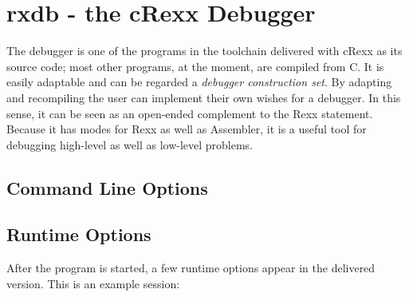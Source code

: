 \chapter{rxdb - the cRexx Debugger}\label{debugger}
The debugger is one of the programs in the toolchain delivered with cRexx
as its source code; most other programs, at the moment, are compiled
from C. It is easily adaptable and can be regarded a \emph{debugger
  construction set}. By adapting and recompiling the user can
implement their own wishes for a debugger. In this sense, it can be
seen as an open-ended complement to the Rexx 
statement. Because it has modes for Rexx as well as
 Assembler, it is a useful tool for debugging
high-level as well as low-level problems.
\section{Command Line Options}
\begin{shaded}
  \small
  \obeylines {}
 \end{shaded}
\section{Runtime Options}
After the  program is started, a few runtime options appear in the
delivered version. This is an example session:
